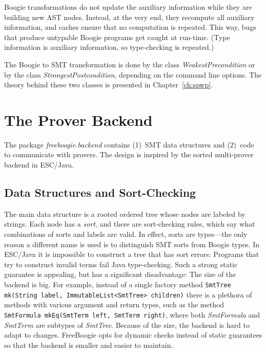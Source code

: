 \documentclass[a4paper]{article}
\newcommand{\jmlCode}{\lstinline[style=jml,basicstyle=\normalsize]}
\newcommand{\escjava}{ESC\slash Java\xspace}
\theoremstyle{slanted}
\theoremstyle{definition}
\theoremstyle{remark}
\begin{document}
Boogie transformations do not update the auxiliary information
while they are building new AST nodes. Instead, at the very end,
they recompute all auxiliary information, and caches ensure that
no computation is repeated. This way, bugs that produce untypable
Boogie programs get caught at run-time. (Type information is
auxiliary information, so type-checking is repeated.)

The Boogie to SMT transformation is done by the
class \textit{WeakestPrecondition} or by the class
\textit{StrongestPostcondition}, depending on the command line
options. The theory behind these two classes is presented in
Chapter~\ref{ch:spwp}.

\section{The Prover Backend}
\label{sec:design.backend}

The package \textit{freeboogie.backend} contains (1)~SMT data
structures and (2)~code to communicate with provers. The design
is inspired by the sorted multi-prover backend in \escjava.

\subsection{Data Structures and Sort-Checking}
\label{sec:design.ds}

The main data structure is a rooted ordered tree whose nodes are
labeled by strings. Each node has a \emph{sort}, and there are
sort-checking rules, which say what combinations of sorts and
labels are valid. In effect, sorts are types---the only reason a
different name is used is to distinguish SMT sorts from
Boogie types. In \escjava it is impossible to construct a tree
that has sort errors: Programs that try to construct invalid
terms fail Java type-checking. Such a strong static guarantee is
appealing, but has a significant disadvantage: The size of the
backend is big. For example, instead of a single factory method
  \jmlCode|SmtTree mk(String label, ImmutableList<SmtTree> children)|
there is a plethora of methods with various argument and return
types, such as the method
  \jmlCode|SmtFormula mkEq(SmtTerm left, SmtTerm right)|,
where both \textit{SmtFormula} and \textit{SmtTerm} are subtypes
of \textit{SmtTree}. Because of the size, the backend is hard to
adapt to changes. FreeBoogie opts for dynamic checks instead of
static guarantees so that the backend is smaller and easier to
maintain.
\end{document}
